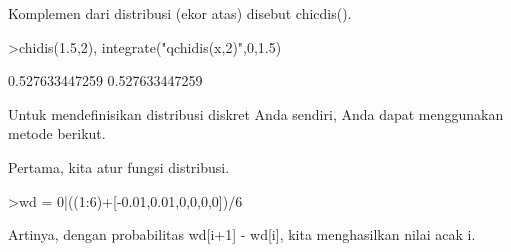 \documentclass[12pt,arial,letterpaper]{book}
\begin{document}
\begin{eulercomment}
\begin{eulercomment}
\begin{eulercomment}
\begin{eulercomment}
\begin{eulercomment}
\begin{eulercomment}
\begin{eulercomment}
\begin{eulercomment}
\begin{eulercomment}
\begin{eulercomment}
\begin{eulercomment}
\begin{eulercomment}
\begin{eulercomment}
\begin{eulercomment}
\begin{eulercomment}
\begin{eulercomment}
\begin{eulercomment}
\begin{eulercomment}
\begin{eulercomment}
\begin{eulercomment}
\begin{eulercomment}
\begin{eulercomment}
\begin{eulercomment}
\begin{eulercomment}
\begin{eulercomment}
\begin{eulercomment}
\begin{eulercomment}
\begin{eulercomment}
\begin{eulercomment}
\begin{eulercomment}
\begin{eulercomment}
\begin{eulercomment}
\begin{eulercomment}
Komplemen dari distribusi (ekor atas) disebut chicdis().
\end{eulercomment}
\begin{eulerprompt}
>chidis(1.5,2), integrate("qchidis(x,2)",0,1.5)
\end{eulerprompt}
\begin{euleroutput}
  0.527633447259
  0.527633447259
\end{euleroutput}
\begin{eulercomment}
Untuk mendefinisikan distribusi diskret Anda sendiri, Anda dapat
menggunakan metode berikut.

Pertama, kita atur fungsi distribusi.
\end{eulercomment}
\begin{eulerprompt}
>wd = 0|((1:6)+[-0.01,0.01,0,0,0,0])/6
\end{eulerprompt}
\begin{euleroutput}
  [0,  0.165,  0.335,  0.5,  0.666667,  0.833333,  1]
\end{euleroutput}
\begin{eulercomment}
Artinya, dengan probabilitas wd[i+1] - wd[i], kita menghasilkan nilai
acak i.


\end{eulercomment}
\end{eulercomment}
\end{eulercomment}
\end{eulercomment}
\end{eulercomment}
\end{eulercomment}
\end{eulercomment}
\end{eulercomment}
\end{eulercomment}
\end{eulercomment}
\end{eulercomment}
\end{eulercomment}
\end{eulercomment}
\end{eulercomment}
\end{eulercomment}
\end{eulercomment}
\end{eulercomment}
\end{eulercomment}
\end{eulercomment}
\end{eulercomment}
\end{eulercomment}
\end{eulercomment}
\end{eulercomment}
\end{eulercomment}
\end{eulercomment}
\end{eulercomment}
\end{eulercomment}
\end{eulercomment}
\end{eulercomment}
\end{eulercomment}
\end{eulercomment}
\end{eulercomment}
\end{eulercomment}
\end{document}
